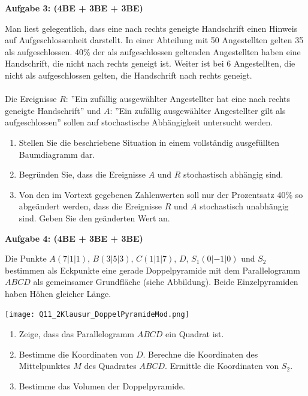 \documentclass[a4paper,12pt]{article}
\newcommand{\Aufgabe}[1]{
  {
  \vspace*{0.5cm}
  \textsf{\textbf{Aufgabe #1}}
  \vspace*{0.2cm}
  
  }
}
\begin{document}
\vspace{2cm}







\Aufgabe{3: (4BE + 3BE + 3BE)}
Man liest gelegentlich, dass eine nach rechts geneigte Handschrift einen Hinweis auf Aufgeschlossenheit darstellt. In einer Abteilung mit 50 Angestellten gelten 35 als aufgeschlossen. 40\% der als aufgeschlossen geltenden Angestellten haben eine Handschrift, die nicht nach rechts geneigt ist. Weiter ist bei 6 Angestellten, die nicht als aufgeschlossen gelten, die Handschrift nach rechts geneigt.\\
\\
Die Ereignisse $R$: ''Ein zufällig ausgewählter Angestellter hat eine nach rechts geneigte Handschrift'' und $A$: ''Ein zufällig ausgewählter Angestellter gilt als aufgeschlossen'' sollen auf stochastische Abhängigkeit untersucht werden.

\begin{enumerate}[label={\alph*)}]
  \item Stellen Sie die beschriebene Situation in einem vollständig ausgefüllten Baumdiagramm dar.
  \item Begründen Sie, dass die Ereignisse $A$ und $R$ stochastisch abhängig sind. 
  \item Von den im Vortext gegebenen Zahlenwerten soll nur der Prozentsatz 40\% so abgeändert werden, dass die Ereignisse $R$ und $A$ stochastisch unabhängig sind. Geben Sie den geänderten Wert an.
\end{enumerate}


\vspace{2cm}

\Aufgabe{4: (4BE + 3BE + 3BE)}
Die Punkte $A(7|1|1)$, $B(3|5|3)$, $C(1|1|7)$, $D$, $S_1(0|-1|0)$ und $S_2$ bestimmen als Eckpunkte eine gerade Doppelpyramide mit dem Parallelogramm $ABCD$ als gemeinsamer Grundfläche (siehe Abbildung). Beide Einzelpyramiden haben Höhen gleicher Länge.

\texttt{[image: Q11\_2Klausur\_DoppelPyramideMod.png]}

\begin{enumerate}[label={\alph*)}]
  \item Zeige, dass das Parallelogramm $ABCD$ ein Quadrat ist.
  \item Bestimme die Koordinaten von $D$. Berechne die Koordinaten des Mittelpunktes $M$ des Quadrates $ABCD$. Ermittle die Koordinaten von $S_2$.
  \item Bestimme das Volumen der Doppelpyramide.
\end{enumerate}
\end{document}
